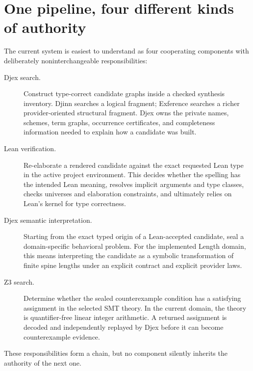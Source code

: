 \documentclass[10pt,letterpaper,oneside]{report}
\begin{document}
\section{One pipeline, four different kinds of authority}

The current system is easiest to understand as four cooperating components with deliberately noninterchangeable responsibilities:

\begin{description}
\item[Djex search.] Construct type-correct candidate graphs inside a checked synthesis inventory. Djinn searches a logical fragment; Exference searches a richer provider-oriented structural fragment. Djex owns the private names, schemes, term graphs, occurrence certificates, and completeness information needed to explain how a candidate was built.

\item[Lean verification.] Re-elaborate a rendered candidate against the exact requested Lean type in the active project environment. This decides whether the spelling has the intended Lean meaning, resolves implicit arguments and type classes, checks universes and elaboration constraints, and ultimately relies on Lean's kernel for type correctness.

\item[Djex semantic interpretation.] Starting from the exact typed origin of a Lean-accepted candidate, seal a domain-specific behavioral problem. For the implemented Length domain, this means interpreting the candidate as a symbolic transformation of finite spine lengths under an explicit contract and explicit provider laws.

\item[Z3 search.] Determine whether the sealed counterexample condition has a satisfying assignment in the selected SMT theory. In the current domain, the theory is quantifier-free linear integer arithmetic. A returned assignment is decoded and independently replayed by Djex before it can become counterexample evidence.
\end{description}

These responsibilities form a chain, but no component silently inherits the authority of the next one.
\end{document}
